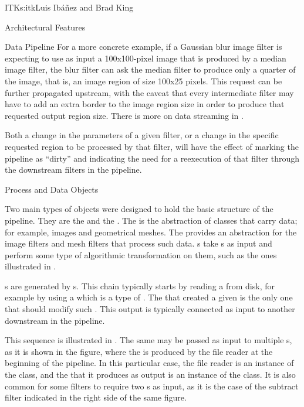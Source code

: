 \begin{aosachapter}{ITK}{s:itk}{Luis Ib\'{a}\~{n}ez and Brad King}
\begin{aosasect1}{Architectural Features}
\begin{aosasect2}{Data Pipeline}
For a more concrete example, if a Gaussian blur image filter is
expecting to use as input a 100x100-pixel image that is produced by a median
image filter, the blur filter can ask the median filter to produce only a
quarter of the image, that is, an image region of size 100x25 pixels.  This
request can be further propagated upstream, with the caveat that every
intermediate filter may have to add an extra border to the image region size in
order to produce that requested output region size.
There is more on data streaming in .

Both a change in the parameters of a given filter, or a change in the
specific requested region to be processed by that filter, will have the
effect of marking the pipeline as ``dirty'' and indicating the need for
a reexecution of that filter through the downstream filters in the pipeline.

\begin{aosasect3}{Process and Data Objects}

Two main types of objects were designed to hold the basic structure of the
pipeline.  They are the  and the . The
 is the abstraction of classes that carry data; for example,
images and geometrical meshes. The  provides an abstraction
for the image filters and mesh filters that process such data.
s take s as input and perform some type of
algorithmic transformation on them, such as the ones illustrated in
.

s are generated by s. This chain typically starts by
reading a  from disk, for example by using a  which is
a type of . The  that created a given  is
the only one that should modify such . This output  is
typically connected as input to another  downstream in the pipeline.


This sequence is illustrated in .
The same  may be passed as input to multiple
s, as it is shown in the figure, where the 
is produced by the file reader at the beginning of the pipeline.
In this particular case, the file reader is an instance of the
 class, and the  that it produces as
output is an instance of the  class.
It is also common for some filters to require two s as input,
as it is the case of the subtract filter indicated in the right side of
the same figure.


\end{aosasect3}
\end{aosasect2}
\end{aosasect1}
\end{aosachapter}

